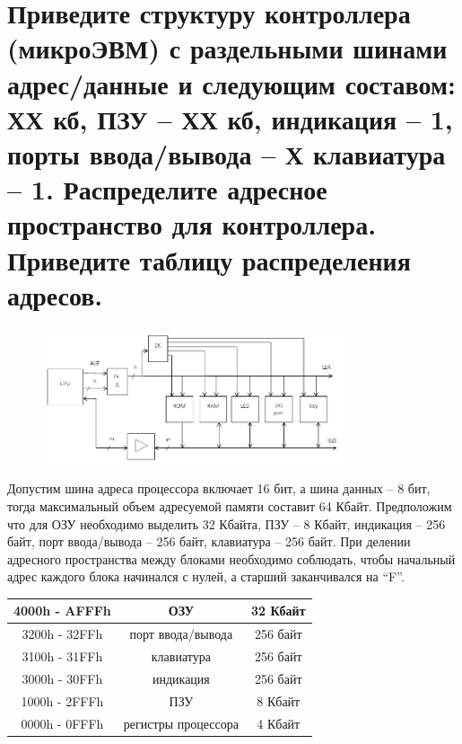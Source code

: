 \documentclass[unicode, 12pt, a4paper, oneside]{article}
\begin{document}
\section{Приведите структуру контроллера (микроЭВМ) с раздельными шинами адрес/данные и следующим составом: ХХ кб, ПЗУ – ХХ кб, индикация – 1, порты ввода/вывода – Х клавиатура – 1. Распределите адресное пространство для контроллера. Приведите таблицу распределения адресов.}

\begin{figure}[H]
\centering
\includegraphics[width=0.8\textwidth]{101_struct.png}
\end{figure}

Допустим шина адреса процессора включает 16 бит, а шина данных – 8 бит, тогда максимальный объем адресуемой памяти составит 64 Кбайт. Предположим что для ОЗУ необходимо выделить 32 Кбайта, ПЗУ – 8 Кбайт, индикация – 256 байт, порт ввода/вывода – 256 байт, клавиатура – 256 байт. При делении адресного пространства между блоками необходимо соблюдать, чтобы начальный адрес каждого блока начинался с нулей, а старший заканчивался на “F”.

\begin{center}
\begin{tabular}{|c|c|c|}
\hline 4000h - AFFFh & ОЗУ                 &  32 Кбайт  \\
\hline 3200h - 32FFh & порт ввода/вывода   &  256 байт  \\
\hline 3100h - 31FFh & клавиатура          & 256 байт   \\
\hline 3000h - 30FFh & индикация           & 256 байт   \\
\hline 1000h - 2FFFh & ПЗУ                 &  8 Кбайт   \\
\hline 0000h - 0FFFh & регистры процессора & 4 Кбайт    \\
\hline
\end{tabular}
\end{center} 
\end{document}
